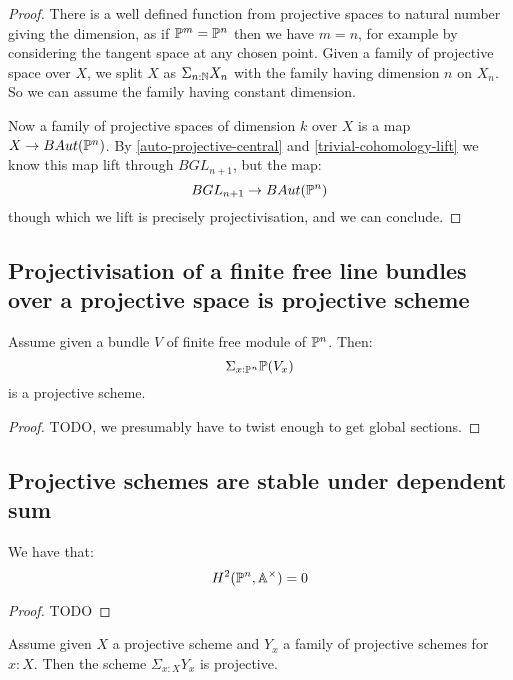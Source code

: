\begin{proof}
There is a well defined function from projective spaces to natural number giving the dimension, as if $\mathbb{P}^m = \mathbb{P}^n$ then we have $m=n$, for example by considering the tangent space at any chosen point. Given a family of projective space over $X$, we split $X$ as $\Sigma_{n:\mathbb{N}}X_n$ with the family having dimension $n$ on $X_n$. So we can assume the family having constant dimension.

Now a family of projective spaces of dimension $k$ over $X$ is a map $X\to BAut(\mathbb{P}^n)$. By \cref{auto-projective-central} and \cref{trivial-cohomology-lift} we know this map lift through $BGL_{n+1}$, but the map:
\[BGL_{n+1} \to BAut(\mathbb{P}^n)\]
though which we lift is precisely projectivisation, and we can conclude.
\end{proof}

\subsection{Projectivisation of a finite free line bundles over a projective space is projective scheme}

\begin{lemma}\label{projectivisation-line-bundle-over-Pn-projective}
Assume given a bundle $V$ of finite free module of $\mathbb{P}^n$. Then:
\[\Sigma_{x:\mathbb{P}^n}\mathbb{P}(V_x)\]
is a projective scheme.
\end{lemma}

\begin{proof}
TODO, we presumably have to twist enough to get global sections.
\end{proof}

\subsection{Projective schemes are stable under dependent sum}

\begin{lemma}\label{projective-2-cohomology-Ax-vanish}
We have that:
\[H^2(\mathbb{P}^n,\mathbb{A}^\times) = 0\]
\end{lemma}

\begin{proof}
TODO
\end{proof}

\begin{proposition}
Assume given $X$ a projective scheme and $Y_x$ a family of projective schemes for $x:X$. Then the scheme $\Sigma_{x:X}Y_x$ is projective.
\end{proposition}

